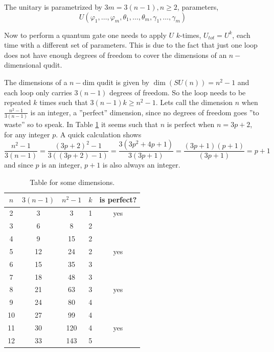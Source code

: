 The unitary is parametrized by $3m = 3(n-1), n\geq 2$, parameters,
\begin{equation}
U(\varphi_1,\dots,\varphi_m,\theta_1,\dots,\theta_m,\gamma_1,\dots,\gamma_m) 
\end{equation} 


Now to perform a quantum gate one needs to apply $U$ $k$-times, $U_{tot} = U^k$, each time with a different set of parameters. This is due to the fact that just one loop does not have enough degrees of freedom to cover the dimensions of an $n-$dimensional qudit.

The dimensions of a $n-$dim qudit is given by $\dim(SU(n)) = n^2 -1$ and each loop only carries $3(n-1)$ degrees of freedom. So the loop needs to be repeated $k$ times such that $3(n-1)k \geq n^2 -1$.
Lets call the dimension $n$ when $\frac{n^2-1}{3(n-1)}$ is an integer, a ''perfect'' dimension, since no degrees of freedom goes ''to waste'' so to speak. In Table \ref{tab:dim} it seems such that $n$ is perfect when $n = 3p + 2$, for any integer $p$.
A quick calculation shows
\begin{equation}
\frac{n^2 -1}{3(n-1)} = \frac{(3p+2)^2-1}{3((3p+2)-1)} = \frac{3(3p^2 + 4p + 1)}{3(3p+1)} = \frac{(3p + 1)(p + 1)}{(3p +1)} = p + 1
\end{equation}
and since $p$ is an integer, $p + 1$ is also always an integer.\\
\begin{table}[H]
\centering 
\begin{tabular}{|c|c|c|c|c|}
\hline
$n$ & $3(n-1)$ & $n^2 - 1$ & $k$ & is perfect?\\
\hline
2& 3& 3& 1& yes\\
3& 6& 8& 2& \\
4& 9& 15& 2& \\
5& 12& 24& 2& yes \\
6& 15& 35& 3& \\
7& 18& 48& 3& \\
8& 21& 63& 3& yes \\
9& 24& 80& 4& \\
10& 27& 99& 4& \\
11& 30& 120& 4& yes \\
12& 33& 143& 5& \\
\hline
\end{tabular}
\caption{Table for some dimensions.}
\label{tab:dim}
\end{table}


